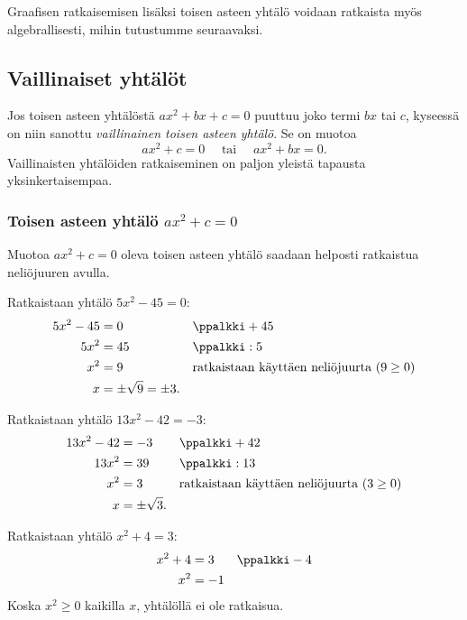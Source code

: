 Graafisen ratkaisemisen lisäksi toisen asteen yhtälö voidaan ratkaista
myös algebrallisesti, mihin tutustumme seuraavaksi.

\subsection*{Vaillinaiset yhtälöt}
Jos toisen asteen yhtälöstä $ax^2+bx+c=0$ puuttuu joko termi $bx$ tai $c$, 
kyseessä on niin sanottu \emph{vaillinainen toisen asteen yhtälö}. Se on muotoa
\[ax^2+c=0 \quad \text{ tai } \quad ax^2+bx=0.\]
Vaillinaisten yhtälöiden ratkaiseminen on paljon yleistä tapausta yksinkertaisempaa.

\subsubsection*{Toisen asteen yhtälö $ax^2+c=0$}
Muotoa $ax^2+c = 0$ oleva toisen asteen yhtälö saadaan helposti ratkaistua neliöjuuren avulla.

\begin{esimerkki}
Ratkaistaan yhtälö $5x^2-45=0$:
\begin{align*}
5x^2-45 &= 0 &&\ppalkki + 45 \\
5x^2 &= 45 &&\ppalkki : 5 \\
x^2 &= 9 &&\text{ratkaistaan käyttäen neliöjuurta ($9 \geq 0$)} \\
x &= \pm \sqrt{9} = \pm 3.
\end{align*}
\end{esimerkki}

\begin{esimerkki}
Ratkaistaan yhtälö $13x^2-42=-3$:
\begin{align*}
13x^2-42 &= -3 &&\ppalkki + 42 \\
13x^2 &= 39 &&\ppalkki : 13 \\
x^2 &= 3 &&\text{ratkaistaan käyttäen neliöjuurta ($3 \geq 0$)} \\
x &= \pm \sqrt{3}.
\end{align*}
\end{esimerkki}

\begin{esimerkki}
Ratkaistaan yhtälö $x^2+4=3$:
\begin{align*}
x^2+4 &= 3 &&\ppalkki - 4 \\
x^2 &= -1
\end{align*}
Koska $x^2 \geq 0$ kaikilla $x$, yhtälöllä ei ole ratkaisua.
\end{esimerkki}

